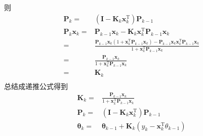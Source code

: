 则
\begin{align*}
\mathbf{P}_k =& (\mathbf{I}-\mathbf{K}_k\boldsymbol{x}_k^\mathrm{T})\mathbf{P}_{k-1}\\
\mathbf{P}_k\boldsymbol{x}_k =& \mathbf{P}_{k-1}\boldsymbol{x}_k
 -\mathbf{K}_k\boldsymbol{x}_k^\mathrm{T}\mathbf{P}_{k-1}\boldsymbol{x}_k \\
=& \frac{\mathbf{P}_{k-1}\boldsymbol{x}_k
 (1+\boldsymbol{x}_k^\mathrm{T}\mathbf{P}_{k-1}\boldsymbol{x}_k)
 -\mathbf{P}_{k-1}\boldsymbol{x}_k\boldsymbol{x}_k^\mathrm{T}
 \mathbf{P}_{k-1}\boldsymbol{x}_k}
 {1+\boldsymbol{x}_k^\mathrm{T}\mathbf{P}_{k-1}\boldsymbol{x}_k} \\
=& \frac{\mathbf{P}_{k-1}\boldsymbol{x}_k}
 {1+\boldsymbol{x}_k^\mathrm{T}\mathbf{P}_{k-1}\boldsymbol{x}_k} \\
=& \mathbf{K}_k \\
\end{align*}
总结成递推公式得到
\begin{align*}
\mathbf{K}_k =& \frac{\mathbf{P}_{k-1}\boldsymbol{x}_k}{1+\boldsymbol{x}_k^\mathrm{T}
\mathbf{P}_{k-1}\boldsymbol{x}_k} \\
\mathbf{P}_k =& (\mathbf{I}-\mathbf{K}_k\boldsymbol{x}_k^\mathrm{T})\mathbf{P}_{k-1}\\
\boldsymbol{\theta}_k =& \boldsymbol{\theta}_{k-1}
 +\mathbf{K}_k(y_k-\boldsymbol{x}_k^\mathrm{T}\theta_{k-1})
\end{align*}

